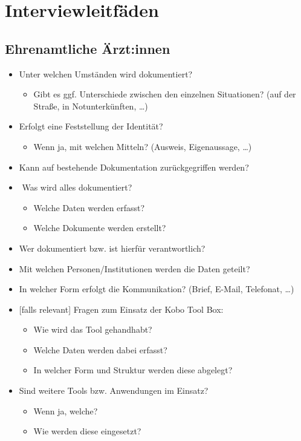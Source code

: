 \chapter{Interviewleitfäden}

\section{Ehrenamtliche Ärzt:innen}

\begin{itemize}
	\item Unter welchen Umständen wird dokumentiert?
	\begin{itemize}
		\item Gibt es ggf. Unterschiede zwischen den einzelnen Situationen? (auf der Straße, in Notunterkünften, …)
	\end{itemize}
	\item Erfolgt eine Feststellung der Identität?
	\begin{itemize}
		\item Wenn ja, mit welchen Mitteln? (Ausweis, Eigenaussage, …)
	\end{itemize}
	\item Kann auf bestehende Dokumentation zurückgegriffen werden?
	\item ­	Was wird alles dokumentiert?
	\begin{itemize}
		\item Welche Daten werden erfasst?
		\item Welche Dokumente werden erstellt?
	\end{itemize}
	\item Wer dokumentiert bzw. ist hierfür verantwortlich?
	\item Mit welchen Personen/Institutionen werden die Daten geteilt?
	\item In welcher Form erfolgt die Kommunikation? (Brief, E-Mail, Telefonat, …)
	\item {}[falls relevant] Fragen zum Einsatz der Kobo Tool Box:
	\begin{itemize}
		\item Wie wird das Tool gehandhabt?
		\item Welche Daten werden dabei erfasst?
		\item In welcher Form und Struktur werden diese abgelegt?
	\end{itemize}
	\item Sind weitere Tools bzw. Anwendungen im Einsatz?
	\begin{itemize}
		\item Wenn ja, welche?
		\item Wie werden diese eingesetzt?
	\end{itemize}
\end{itemize}


